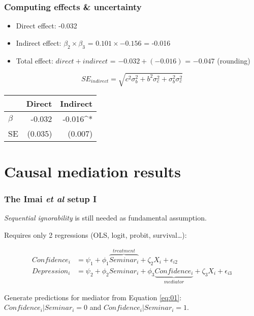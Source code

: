 \documentclass[11pt,english,dvipsnames,aspectratio=169,handout]{beamer}\usepackage[]{graphicx}\usepackage[]{xcolor}
\begin{document}
\begin{frame}
\frametitle{Computing effects \& uncertainty}

\begin{itemize}
\setlength\itemsep{1.5em}
  \item Direct effect: -0.032
  \item Indirect effect: $\beta_2\times \beta_3$ = $0.101\times -0.156$ = -0.016
  \item Total effect: $direct + indirect$ = $-0.032 + (-0.016)$ = $-0.047$ (rounding)
\end{itemize}
\pause

\begin{equation}
  SE_{indirect} = \sqrt{c^2\sigma_b^2 + b^2\sigma_c^2 + \sigma_b^2\sigma_c^2}
\end{equation}
\pause



\begin{table}
\scriptsize
\begin{tabular}{l D{.}{.}{4.6} D{.}{.}{4.6}}
\toprule
  &  &  \\
\midrule
$\beta$ & -0.032 & -0.016^{*} \\
SE  &  (0.035) & (0.007) \\ 
\bottomrule
\end{tabular}
\end{table}

\end{frame}


\section{Causal mediation results}

\begin{frame}
  \frametitle{The Imai \textit{et al} setup I}
  \textit{Sequential ignorability} is still needed as fundamental assumption.\bigskip
  
  Requires only 2 regressions (OLS, logit, probit, survival\dots):
  
   \footnotesize
   \begin{align}
   Confidence_i &= \psi_1 + \phi_1\overbrace{Seminar_i}^{treatment} + \zeta_2X_i + \epsilon_{i2}\label{eq:01}\\
   Depression_i &= \psi_2 + \phi_2Seminar_i + \phi_3\underbrace{Confidence_i}_{mediator} + \zeta_3X_i + \epsilon_{i3} \label{eq:02}
   \end{align}
  \pause
  \normalsize
  
  Generate predictions for mediator from Equation \ref{eq:01}: $Confidence_i | Seminar_i=0$ and $Confidence_i | Seminar_i=1$.
\end{frame}
\end{document}

